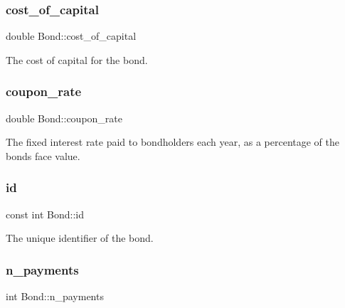 \mbox{\label{classBond_ad98df7d28b398e620286f95ee085439b}} 
\subsubsection{\texorpdfstring{cost\+\_\+of\+\_\+capital}{cost\_of\_capital}}
{\footnotesize\ttfamily double Bond\+::cost\+\_\+of\+\_\+capital\hspace{0.3cm}{\ttfamily [protected]}}



The cost of capital for the bond. 

\mbox{\label{classBond_a5f66785534e24caa43d9f730130a6463}} 
\subsubsection{\texorpdfstring{coupon\+\_\+rate}{coupon\_rate}}
{\footnotesize\ttfamily double Bond\+::coupon\+\_\+rate\hspace{0.3cm}{\ttfamily [protected]}}



The fixed interest rate paid to bondholders each year, as a percentage of the bond\textquotesingle{}s face value. 

\mbox{\label{classBond_a7f75bcafbc16676ad6dbafbf40afae4a}} 
\subsubsection{\texorpdfstring{id}{id}}
{\footnotesize\ttfamily const int Bond\+::id}



The unique identifier of the bond. 

\mbox{\label{classBond_a4a227b6de2eeada118d82ab1633b1db8}} 
\subsubsection{\texorpdfstring{n\+\_\+payments}{n\_payments}}
{\footnotesize\ttfamily int Bond\+::n\+\_\+payments\hspace{0.3cm}{\ttfamily [protected]}}



